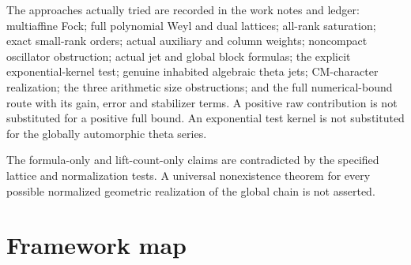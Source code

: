 The approaches actually tried are recorded in the work notes and
ledger: multiaffine Fock; full polynomial Weyl and dual lattices;
all-rank saturation; exact small-rank orders; actual auxiliary and
column weights; noncompact oscillator obstruction; actual jet and
global block formulas; the explicit exponential-kernel test; genuine
inhabited algebraic theta jets; CM-character realization; the three
arithmetic size obstructions; and
the full numerical-bound route with its gain, error and stabilizer
terms. A positive raw contribution is not substituted for a
positive full bound. An exponential test kernel is not substituted
for the globally automorphic theta series.

The formula-only and lift-count-only claims are contradicted by
the specified lattice and normalization tests. A universal
nonexistence theorem for every possible normalized geometric
realization of the global chain is not asserted.

\section{Framework map}

